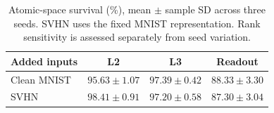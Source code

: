 \begin{table}[!htbp]\centering
\caption{Atomic-space survival (\%), mean $\pm$ sample SD across three seeds. SVHN uses the fixed MNIST representation. Rank sensitivity is assessed separately from seed variation.}
\label{tab:newinput-svhn}
\small\begin{tabular}{lccc}\toprule
Added inputs & L2 & L3 & Readout\\\midrule
Clean MNIST & $95.63 \pm 1.07$ & $97.39 \pm 0.42$ & $88.33 \pm 3.30$\\
SVHN & $98.41 \pm 0.91$ & $97.20 \pm 0.58$ & $87.30 \pm 3.04$\\\bottomrule\end{tabular}\end{table}
